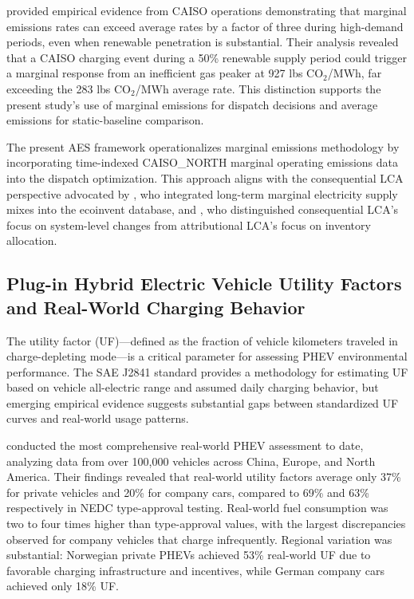 \documentclass[cleantechnol,article,submit,pdftex,moreauthors]{Definitions/mdpi}
\begin{document}
\citet{WattTime2024} provided empirical evidence from CAISO operations demonstrating that marginal emissions rates can exceed average rates by a factor of three during high-demand periods, even when renewable penetration is substantial. Their analysis revealed that a CAISO charging event during a 50\% renewable supply period could trigger a marginal response from an inefficient gas peaker at 927 lbs CO$_2$/MWh, far exceeding the 283 lbs CO$_2$/MWh average rate. This distinction supports the present study's use of marginal emissions for dispatch decisions and average emissions for static-baseline comparison.

The present AES framework operationalizes marginal emissions methodology by incorporating time-indexed CAISO\_NORTH marginal operating emissions data into the dispatch optimization. This approach aligns with the consequential LCA perspective advocated by \citet{Vandepaer2019}, who integrated long-term marginal electricity supply mixes into the ecoinvent database, and \citet{Earles2011}, who distinguished consequential LCA's focus on system-level changes from attributional LCA's focus on inventory allocation.

\subsection{Plug-in Hybrid Electric Vehicle Utility Factors and Real-World Charging Behavior}

The utility factor (UF)—defined as the fraction of vehicle kilometers traveled in charge-depleting mode—is a critical parameter for assessing PHEV environmental performance. The SAE J2841 standard provides a methodology for estimating UF based on vehicle all-electric range and assumed daily charging behavior, but emerging empirical evidence suggests substantial gaps between standardized UF curves and real-world usage patterns.

\citet{Plotz2020b} conducted the most comprehensive real-world PHEV assessment to date, analyzing data from over 100,000 vehicles across China, Europe, and North America. Their findings revealed that real-world utility factors average only 37\% for private vehicles and 20\% for company cars, compared to 69\% and 63\% respectively in NEDC type-approval testing. Real-world fuel consumption was two to four times higher than type-approval values, with the largest discrepancies observed for company vehicles that charge infrequently. Regional variation was substantial: Norwegian private PHEVs achieved 53\% real-world UF due to favorable charging infrastructure and incentives, while German company cars achieved only 18\% UF.
\end{document}
